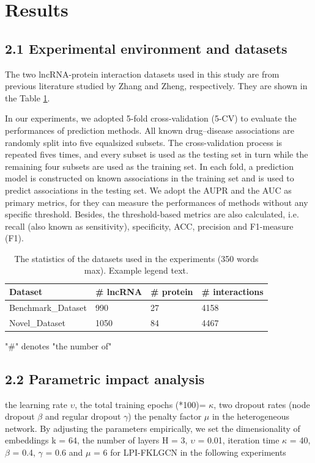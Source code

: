 \documentclass[fleqn,10pt]{wlscirep}
\begin{document}
\section*{Results}
\subsection*{2.1 Experimental environment and datasets}
The two lncRNA-protein interaction datasets used in this study are from previous literature studied by Zhang\cite{Zhang2018} and Zheng\cite{Zheng2017a}, respectively. They are shown in the Table \ref{tab:datasets}.



In our experiments, we adopted 5-fold cross-validation (5-CV)
to evaluate the performances of prediction methods. All known drug–disease associations are randomly split into five equalsized subsets. The cross-validation process is repeated fives times, and every subset is used as the testing set in turn while the remaining four subsets are used as the training set. In each fold, a prediction model is constructed on known associations in the training set and is used to predict associations in the testing set. We adopt the AUPR and the AUC as primary metrics, for they can measure the performances of methods without any specific threshold. Besides, the threshold-based metrics are also calculated, i.e. recall (also known as sensitivity), specificity, ACC, precision and F1-measure (F1).


\begin{table}[ht]
\centering
\caption{\label{tab:datasets} The statistics of the datasets used in the experiments (350 words max). Example legend text.}
\begin{threeparttable}[b]
\begin{tabular}{|l|l|l|l|}
\hline
Dataset & \# lncRNA & \# protein & \# interactions \\
\hline
Benchmark_Dataset & 990 & 27 & 4158\\
\hline
Novel_Dataset & 1050 & 84 & 4467 \\
\hline
\end{tabular}
\begin{tablenotes}
     \item "\#" denotes "the number of"
     \end{tablenotes}
     \end{threeparttable}
\end{table}

\subsection*{2.2 Parametric impact analysis}
the learning rate $\upsilon$, 
the total training epochs (*100)= $\kappa$,
two dropout rates (node dropout $\beta$ and regular dropout $\gamma$)
the penalty factor $\mu$ in the heterogeneous network.  
By adjusting the parameters empirically,
we set the dimensionality of embeddings k = 64, the number of layers H = 3, 
$\upsilon$ = 0.01, iteration time $\kappa$ = 40, $\beta$ = 0.4, $\gamma$ = 0.6 and $\mu$ = 6 for LPI-FKLGCN in the following experiments
\end{document}
